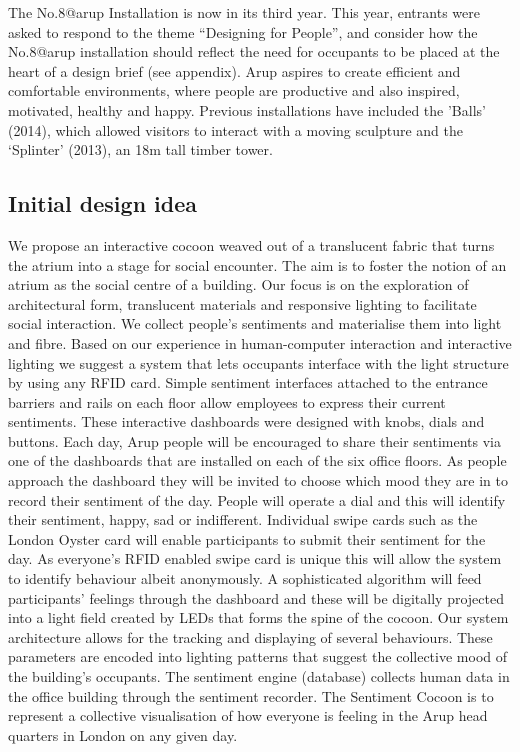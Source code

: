 The No.8@arup Installation is now in its third year. This year, entrants were asked to respond to the theme “Designing for People”, and consider how the No.8@arup installation should reflect the need for occupants to be placed at the heart of a design brief (see appendix). Arup aspires to create efficient and comfortable environments, where people are productive and also inspired, motivated, healthy and happy.
Previous installations have included the 'Balls'  (2014), which allowed visitors to interact with a moving sculpture and the ‘Splinter’  (2013), an 18m tall timber tower.

\subsection{Initial design idea}

We propose an interactive cocoon weaved out of a translucent fabric that turns the atrium into a stage for social encounter. The aim is to foster the notion of an atrium as the social centre of a building. Our focus is on the exploration of architectural form, translucent materials and responsive lighting to facilitate social interaction. We collect people’s sentiments and materialise them into light and fibre.
Based on our experience in human-computer interaction and interactive lighting we suggest a system that lets occupants interface with the light structure by using any RFID card. Simple sentiment interfaces attached to the entrance barriers and rails on each floor allow employees to express their current sentiments. These interactive dashboards were designed with knobs, dials and buttons. Each day, Arup people will be encouraged to share their sentiments via one of the dashboards that are installed on each of the six office floors. As people approach the dashboard they will be invited to choose which mood they are in to record their sentiment of the day. People will operate a dial and this will identify their sentiment, happy, sad or indifferent. Individual swipe cards such as the London Oyster card will enable participants to submit their sentiment for the day. As everyone’s RFID enabled swipe card is unique this will allow the system to identify behaviour albeit anonymously. A sophisticated algorithm will feed participants’ feelings through the dashboard and these will be digitally projected into a light field created by LEDs that forms the spine of the cocoon.
Our system architecture allows for the tracking and displaying of several behaviours. These parameters are encoded into lighting patterns that suggest the collective mood of the building’s occupants. The sentiment engine (database) collects human data in the office building through the sentiment recorder. The Sentiment Cocoon is to represent a collective visualisation of how everyone is feeling in the Arup head quarters in London on any given day. 
